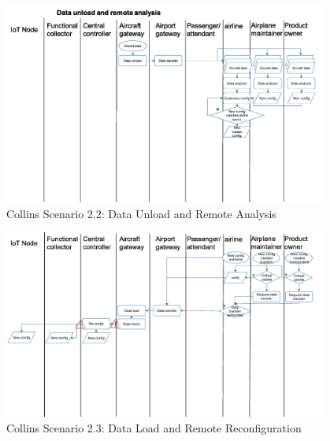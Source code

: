 \begin{figure}
	\begin{center}
		\includegraphics[width=0.95\textwidth]{figures/collins-s2-data-unload-remote-analysis.jpg}
	\end{center}
	\caption{Collins Scenario 2.2: Data Unload and Remote Analysis}
	\label{fig:collins-s2-data-unload-remote-analysis}
\end{figure}

\begin{figure}
	\begin{center}
		\includegraphics[width=0.95\textwidth]{figures/collins-s2-data-load-remote-config.jpg}
	\end{center}
	\caption{Collins Scenario 2.3: Data Load and Remote Reconfiguration}
	\label{fig:collins-s2-data-load-remote-config}
\end{figure}

